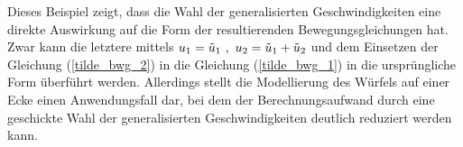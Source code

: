 Dieses Beispiel zeigt, dass die Wahl der generalisierten Geschwindigkeiten eine direkte Auswirkung auf die Form der resultierenden Bewegungsgleichungen hat. Zwar kann die letztere mittels $u_{\text{1}} = \tilde{u}_{\text{1}} \ ,\ u_{\text{2}} = \tilde{u}_{\text{1}} + \tilde{u}_{\text{2}}$ und dem Einsetzen der Gleichung (\ref{tilde_bwg_2}) in die Gleichung (\ref{tilde_bwg_1}) in die ursprüngliche Form überführt werden. Allerdings stellt die Modellierung des Würfels auf einer Ecke einen Anwendungsfall dar, bei dem der Berechnungsaufwand durch eine geschickte Wahl der generalisierten Geschwindigkeiten deutlich reduziert werden kann.